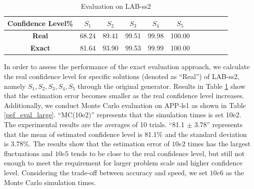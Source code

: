 \documentclass[lettersize,journal]{IEEEtran}
\begin{document}
\begin{table}[!t]
\caption{Evaluation on LAB-ss2}
\centering
\begin{tabular}{ccccccccccc}
\toprule
{\bfseries Confidence Level\%} & $S_1$ & $S_2$ & $S_3$ & $S_4$ & $S_5$\\
\midrule
{\bfseries Real} &68.24&89.41 &99.51 &99.98&100.00 \\
{\bfseries Exact} &81.64 &93.90 &99.53 &99.99 &100.00 \\
\bottomrule
\end{tabular}
\label{pef_eval_small}
\end{table}

\begin{table}[!t]
\caption{Evaluation on APP-ls1}
\centering
{}
\label{pef_eval_large}
\end{table}

In order to assess the performance of the exact evaluation approach, we calculate the real confidence level for specific solutions (denoted as ``Real'') of LAB-ss2, namely $S_1, S_2, S_3, S_4, S_5$ through the original generator.  
Results in Table \ref{pef_eval_small} show that the estimation error becomes smaller as the real confidence level increases.
Additionally, we conduct Monte Carlo evaluation on APP-ls1 as shown in Table \ref{pef_eval_large}. 
``MC(10e2)'' represents that the simulation times is set 10e2. 
The experimental results are the averages of 10 trials.
``81.1 $\pm$ 3.78'' represents that the mean of estimated confidence level is 81.1\% and the standard deviation is 3.78\%. 
The results show that the estimation error of $10e2$ times has the largest fluctuations and $10e5$ tends to be close to the real confidence level, but still not enough to meet the requirement for larger problem scale and higher confidence level. 
Considering the trade-off between accuracy and speed, we set $10e6$ as the Monte Carlo simulation times.
\end{document}
